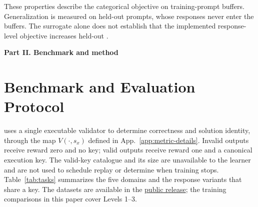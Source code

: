These properties describe the categorical objective on training-prompt buffers.
Generalization is measured on held-out prompts, whose responses never enter
the buffers. The surrogate alone does not establish that the implemented
response-level objective increases held-out \pmd{}.


\clearpage
{}
\begin{center}\large\textbf{Part II. Benchmark and method}\end{center}

\section{Benchmark and Evaluation Protocol}
\label{app:data}
\label{app:experimental-design}
\label{app:domain-overview}
\label{app:data-inventory}

\mb{} uses a single executable validator to determine correctness and
solution identity, through the map $V(\cdot,s_x)$ defined in
App.~\ref{app:metric-details}. Invalid outputs receive reward zero and no
key; valid outputs receive reward one and a canonical execution key. The
valid-key catalogue and its size are unavailable to the learner and are not
used to schedule replay or determine when training stops.
Table~\ref{tab:tasks} summarizes the five domains and the response variants
that share a key. The datasets are available in the
\href{https://huggingface.co/datasets/od2961/ModeBench}{public release};
the training comparisons in this paper cover Levels 1--3.

